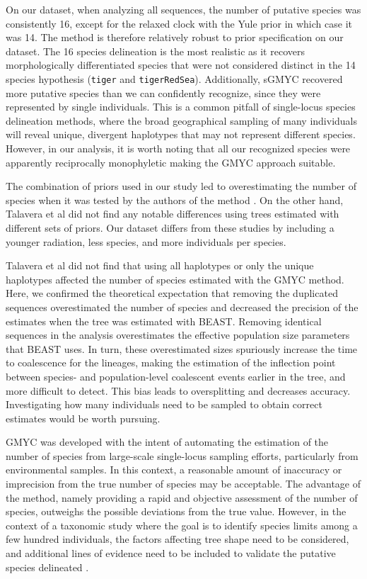 \documentclass[12pt,letterpaper]{article}\usepackage[]{graphicx}\usepackage[]{color}
\begin{document}
On our dataset, when analyzing all sequences, the number of putative species was
consistently 16, except for the relaxed clock with the Yule prior in which case
it was 14. The method is therefore relatively robust to prior specification on
our dataset. The 16 species delineation is the most realistic as it recovers
morphologically differentiated species that were not considered distinct in the
14 species hypothesis (\texttt{tiger} and \texttt{tigerRedSea}). Additionally,
sGMYC recovered more putative species than we can confidently recognize, since
they were represented by single individuals. This is a common pitfall of
single-locus species delineation methods, where the broad geographical sampling
of many individuals will reveal unique, divergent haplotypes that may not
represent different species. However, in our analysis, it is worth noting that
all our recognized species were apparently reciprocally monophyletic making the
GMYC approach suitable.

The combination of priors used in our study led to overestimating the number of
species when it was tested by the authors of the method \citep{Monaghan2009}. On
the other hand, Talavera et al \citep{Talavera2013} did not find any notable
differences using trees estimated with different sets of priors. Our dataset
differs from these studies by including a younger radiation, less species, and
more individuals per species.


Talavera et al \citep{Talavera2013} did not find that using all haplotypes or
only the unique haplotypes affected the number of species estimated with the
GMYC method. Here, we confirmed the theoretical expectation that removing the
duplicated sequences overestimated the number of species and decreased the
precision of the estimates when the tree was estimated with BEAST. Removing
identical sequences in the analysis overestimates the effective population size
parameters that BEAST uses. In turn, these overestimated sizes spuriously
increase the time to coalescence for the lineages, making the estimation of the
inflection point between species- and population-level coalescent events earlier
in the tree, and more difficult to detect. This bias leads to oversplitting and
decreases accuracy. Investigating how many individuals need to be sampled to
obtain correct estimates would be worth pursuing.

GMYC was developed with the intent of automating the estimation of the number of
species from large-scale single-locus sampling efforts, particularly from
environmental samples. In this context, a reasonable amount of inaccuracy or
imprecision from the true number of species may be acceptable. The advantage of
the method, namely providing a rapid and objective assessment of the number of
species, outweighs the possible deviations from the true value. However, in the
context of a taxonomic study where the goal is to identify species limits among
a few hundred individuals, the factors affecting tree shape need to be
considered, and additional lines of evidence need to be included to validate the
putative species delineated \citep{Marshall2011a, Esselstyn2012}.
\end{document}
